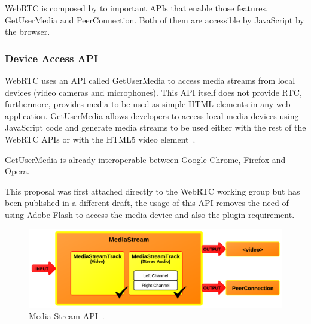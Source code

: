 WebRTC is composed by to important APIs that enable those features, GetUserMedia and PeerConnection. Both of them are accessible by JavaScript by the browser.
%
%

\subsubsection{Device Access API}

WebRTC uses an API called GetUserMedia to access media streams from local devices (video cameras and microphones). This API itself does not provide RTC, furthermore, provides media to be used as simple HTML elements in any web application. GetUserMedia allows developers to access local media devices using JavaScript code and generate media streams to be used either with the rest of the WebRTC APIs or with the HTML5 video element~\cite{getusermediaDraft}.

GetUserMedia is already interoperable between Google Chrome, Firefox and Opera.

This proposal was first attached directly to the WebRTC working group but has been published in a different draft, the usage of this API removes the need of using Adobe Flash to access the media device and also the plugin requirement.

 \begin{figure}[h]
  \centering
    \includegraphics[scale=1]{./figures/mediastreamAPI.png}
      \caption[Media Stream API~\cite{getusermediaDraft}]{Media Stream API~\cite{getusermediaDraft}.}
	\label{fig:mediastreamAPI}
\end{figure}

